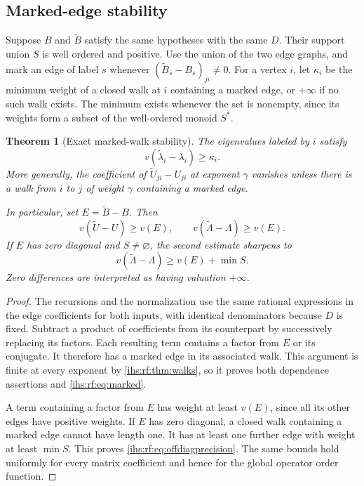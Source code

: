 \documentclass[11pt,a4paper]{article}
\numberwithin{equation}{section}
\newtheorem{theorem}{Theorem}[section]
\theoremstyle{definition}
\theoremstyle{remark}
\begin{document}
\subsection{Marked-edge stability}\label{ihs:rf:sec:marked}

Suppose $B$ and $\widetilde B$ satisfy the same hypotheses with the same
$D$. Their support union $S$ is well ordered and positive. Use the union of
the two edge graphs, and mark an edge of label $s$ whenever
$(\widetilde B_s-B_s)_{ji}\ne0$. For a vertex $i$, let $\kappa_i$ be the
minimum weight of a closed walk at $i$ containing a marked edge, or
$+\infty$ if no such walk exists. The minimum exists whenever the set is
nonempty, since its weights form a subset of the well-ordered monoid $S^*$.

\begin{theorem}[Exact marked-walk stability]\label{ihs:rf:thm:marked}
The eigenvalues labeled by $i$ satisfy
\begin{equation}\label{ihs:rf:eq:marked}
 v(\widetilde\lambda_i-\lambda_i)\ge\kappa_i.
\end{equation}
More generally, the coefficient of $\widetilde U_{ji}-U_{ji}$ at exponent
$\gamma$ vanishes unless there is a walk from $i$ to $j$ of weight $\gamma$
containing a marked edge.

In particular, set $E=\widetilde B-B$. Then
\[
 v(\widetilde U-U)\ge v(E),\qquad v(\widetilde\Lambda-\Lambda)\ge v(E).
\]
If $E$ has zero diagonal and $S\ne\varnothing$, the second estimate sharpens
to
\begin{equation}\label{ihs:rf:eq:offdiagprecision}
 v(\widetilde\Lambda-\Lambda)\ge v(E)+\min S.
\end{equation}
Zero differences are interpreted as having valuation $+\infty$.
\end{theorem}
\begin{proof}
The recursions and the normalization use the same rational expressions in
the edge coefficients for both inputs, with identical denominators because
$D$ is fixed. Subtract a product of coefficients from its counterpart by
successively replacing its factors. Each resulting term contains a factor
from $E$ or its conjugate. It therefore has a marked edge in its associated
walk. This argument is finite at every exponent by
\cref{ihs:rf:thm:walks}, so it proves both dependence assertions and
\eqref{ihs:rf:eq:marked}.

A term containing a factor from $E$ has weight at least $v(E)$, since all
its other edges have positive weights. If $E$ has zero diagonal, a closed
walk containing a marked edge cannot have length one. It has at least one
further edge with weight at least $\min S$. This proves
\eqref{ihs:rf:eq:offdiagprecision}. The same bounds hold uniformly for every
matrix coefficient and hence for the global operator order function.
\end{proof}
\end{document}
